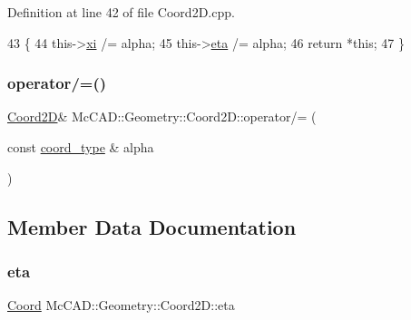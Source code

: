 Definition at line 42 of file Coord2\+D.\+cpp.


\begin{DoxyCode}
43                                 \{
44     this->\hyperlink{classMcCAD_1_1Geometry_1_1Coord2D_a5b99b9ce570b6bd792bd485fb2f305bb}{xi} /= alpha;
45     this->\hyperlink{classMcCAD_1_1Geometry_1_1Coord2D_afa71c0967f3d43fe50e61abd731c8f5e}{eta} /= alpha;
46     \textcolor{keywordflow}{return} *\textcolor{keyword}{this};
47 \}
\end{DoxyCode}
\mbox{\label{classMcCAD_1_1Geometry_1_1Coord2D_a30849806186f3b496b03c34c3c2142ad}} 
\subsubsection{\texorpdfstring{operator/=()}{operator/=()}\hspace{0.1cm}{\footnotesize\ttfamily [2/2]}}
{\footnotesize\ttfamily \hyperlink{classMcCAD_1_1Geometry_1_1Coord2D}{Coord2D}\& Mc\+C\+A\+D\+::\+Geometry\+::\+Coord2\+D\+::operator/= (\begin{DoxyParamCaption}\item[{const \hyperlink{namespaceMcCAD_1_1Geometry_ac043b37a4a7e849fca22869e1982d2f8}{coord\+\_\+type} \&}]{alpha }\end{DoxyParamCaption})}



\subsection{Member Data Documentation}
\mbox{\label{classMcCAD_1_1Geometry_1_1Coord2D_afa71c0967f3d43fe50e61abd731c8f5e}} 
\subsubsection{\texorpdfstring{eta}{eta}}
{\footnotesize\ttfamily \hyperlink{classMcCAD_1_1Geometry_1_1Coord}{Coord} Mc\+C\+A\+D\+::\+Geometry\+::\+Coord2\+D\+::eta}



